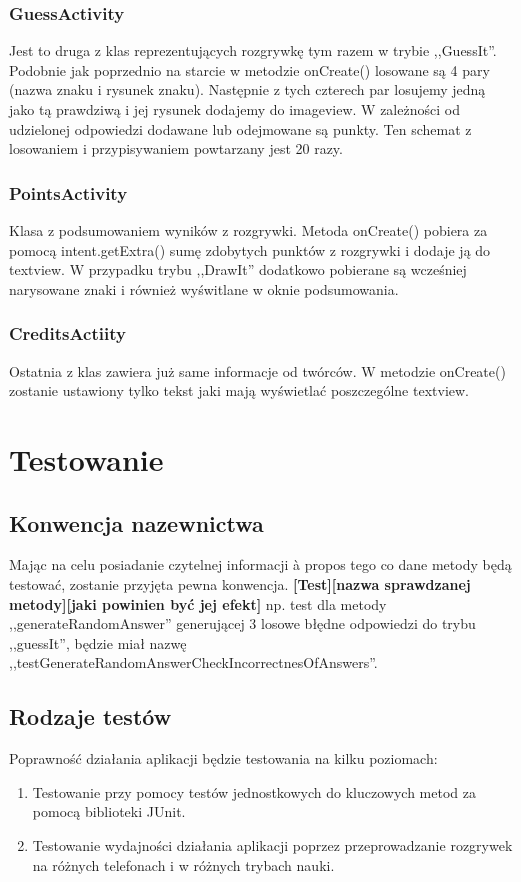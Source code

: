 \documentclass[15pt]{article}
\begin{document}
  \subsubsection{GuessActivity}
  Jest to druga z klas reprezentujących rozgrywkę tym razem w trybie ,,GuessIt''. Podobnie jak poprzednio na starcie w metodzie onCreate() losowane są 4 pary (nazwa znaku i rysunek znaku). Następnie z tych czterech par losujemy jedną jako tą prawdziwą i jej rysunek dodajemy do imageview. W zależności od udzielonej odpowiedzi dodawane lub odejmowane są punkty. Ten schemat z losowaniem i przypisywaniem powtarzany jest 20 razy.
  
  \newpage
  \subsubsection{PointsActivity}
  Klasa z podsumowaniem wyników z rozgrywki. Metoda onCreate() pobiera za pomocą intent.getExtra() sumę zdobytych punktów z rozgrywki i dodaje ją do textview. W przypadku trybu ,,DrawIt'' dodatkowo pobierane są wcześniej narysowane znaki i również wyświtlane w oknie podsumowania. 
  
  \subsubsection{CreditsActiity}
  Ostatnia z klas zawiera już same informacje od twórców. W metodzie onCreate() zostanie ustawiony tylko tekst jaki mają wyświetlać poszczególne textview. 
  
  \section{Testowanie}
  \subsection{Konwencja nazewnictwa}
  Mając na celu posiadanie czytelnej informacji à propos tego co dane metody będą testować, zostanie przyjęta pewna konwencja.
  \newline
  \newline
  \textbf{[Test][nazwa sprawdzanej metody][jaki powinien być jej efekt]}
  \newline
  \newline
  np. test dla metody ,,generateRandomAnswer'' generującej 3 losowe błędne odpowiedzi do trybu ,,guessIt'', będzie miał nazwę ,,testGenerateRandomAnswerCheckIncorrectnesOfAnswers''.
  \subsection{Rodzaje testów}
  Poprawność działania aplikacji będzie testowania na kilku poziomach:
  \begin{enumerate}
    \item Testowanie przy pomocy testów jednostkowych do kluczowych metod za pomocą biblioteki JUnit.
    \item Testowanie wydajności działania aplikacji poprzez przeprowadzanie rozgrywek na różnych telefonach i w różnych trybach nauki.
  \end{enumerate}
  
  
\end{document}
